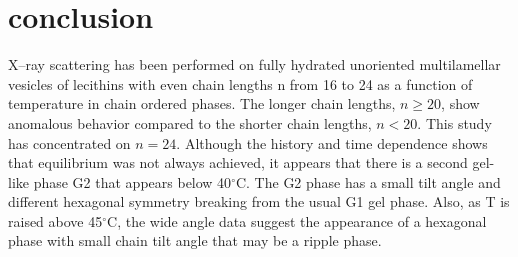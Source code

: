 \section{conclusion}
X--ray scattering has been performed on fully hydrated unoriented
multilamellar vesicles of lecithins with even chain lengths n from 16 to 24
as a function of temperature in chain ordered phases. The longer chain lengths, 
$n \geq 20$, show anomalous behavior compared to the shorter chain lengths,
$n< 20$.  This study has concentrated on $n = 24$.  Although the history
and time dependence shows that equilibrium was not always achieved, it
appears that there is a second gel-like phase G2 that appears
below 40$^{\circ}$C.  The G2 phase has a small tilt angle
and different hexagonal symmetry breaking from the usual G1 gel phase.
Also, as T is raised above 45$^{\circ}$C, the wide angle data suggest
the appearance of a hexagonal phase with small chain tilt angle that may 
be a ripple phase.

